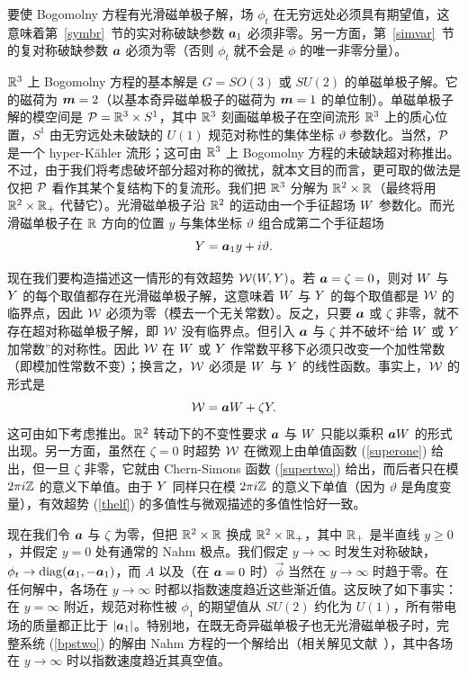 要使 Bogomolny 方程有光滑磁单极子解，场 $\phi_t$ 在无穷远处必须具有期望值，这意味着第~\ref{symbr}~节的实对称破缺参数 $\ca_1$ 必须非零。另一方面，第~\ref{simvar}~节的复对称破缺参数 $\ca$ 必须为零（否则 $\phi_t$ 就不会是 $\phi$ 的唯一非零分量）。


$\R^3$ 上 Bogomolny 方程的基本解是 $G=SO(3)$ 或 $SU(2)$ 的单磁单极子解。它的磁荷为 $\m=2$（以基本奇异磁单极子的磁荷为 $\m=1$ 的单位制）。单磁单极子解的模空间是 $\P=\R^3\times S^1$，其中 $\R^3$ 刻画磁单极子在空间流形 $\R^3$ 上的质心位置，$S^1$ 由无穷远处未破缺的 $U(1)$ 规范对称性的集体坐标 $\vartheta$ 参数化。当然，$\P$ 是一个 hyper-Kähler 流形；这可由 $\R^3$ 上 Bogomolny 方程的未破缺超对称推出。不过，由于我们将考虑破坏部分超对称的微扰，就本文目的而言，更可取的做法是仅把 $\P$ 看作其某个复结构下的复流形。我们把 $\R^3$ 分解为 $\R^2\times \R$（最终将用 $\R^2\times \R_+$ 代替它）。光滑磁单极子沿 $\R^2$ 的运动由一个手征超场 $\sW$ 参数化。而光滑磁单极子在 $\R$ 方向的位置 $y$ 与集体坐标 $\vartheta$ 组合成第二个手征超场
\begin{equation}\label{work}\sY=\ca_1 y+i\vartheta.   \end{equation}

现在我们要构造描述这一情形的有效超势 $\W(\sW,\sY)$。若 $\ca=\zeta=0$，则对 $\sW$ 与 $\sY$ 的每个取值都存在光滑磁单极子解，这意味着 $\sW$ 与 $\sY$ 的每个取值都是 $\W$ 的临界点，因此 $\W$ 必须为零（模去一个无关常数）。反之，只要 $\ca$ 或 $\zeta$ 非零，就不存在超对称磁单极子解，即 $\W$ 没有临界点。但引入 $\ca$ 与 $\zeta$ 并不破坏“给 $\sW$ 或 $\sY$ 加常数”的对称性。因此 $\W$ 在 $\sW$ 或 $\sY$ 作常数平移下必须只改变一个加性常数（即模加性常数不变）；换言之，$\W$ 必须是 $\sW$ 与 $\sY$ 的线性函数。事实上，$\W$ 的形式是
\begin{equation}\label{thelf}\W=\ca \sW+\zeta \sY.    \end{equation}
这可由如下考虑推出。$\R^2$ 转动下的不变性要求 $\ca$ 与 $\sW$ 只能以乘积 $\ca \sW$ 的形式出现。另一方面，虽然在 $\zeta=0$ 时超势 $\W$ 在微观上由单值函数 (\ref{superone}) 给出，但一旦 $\zeta$ 非零，它就由 Chern-Simons 函数 (\ref{supertwo}) 给出，而后者只在模 $2\pi i\Z$ 的意义下单值。由于 $\sY$ 同样只在模 $2\pi i\Z$ 的意义下单值（因为 $\vartheta$ 是角度变量），有效超势 (\ref{thelf}) 的多值性与微观描述的多值性恰好一致。

现在我们令 $\ca$ 与 $\zeta$ 为零，但把 $\R^2\times \R$ 换成 $\R^2\times \R_+$，其中 $\R_+$ 是半直线 $y\geq 0$，并假定 $y=0$ 处有通常的 Nahm 极点。我们假定 $y\to\infty$ 时发生对称破缺，$\phi_t\to {\mathrm{diag}}(\ca_1,-\ca_1)$，而 $A$ 以及（在 $\ca=0$ 时）$\vec\phi$ 当然在 $y\to\infty$ 时趋于零。在任何解中，各场在 $y\to\infty$ 时都以指数速度趋近这些渐近值。这反映了如下事实：在 $y=\infty$ 附近，规范对称性被 $\phi_1$ 的期望值从 $SU(2)$ 约化为 $U(1)$，所有带电场的质量都正比于 $|\ca_1|$。特别地，在既无奇异磁单极子也无光滑磁单极子时，完整系统 (\ref{bpstwo}) 的解由 Nahm 方程的一个解给出（相关解见文献~\cite{Krontwo}），其中各场在 $y\to\infty$ 时以指数速度趋近其真空值。

